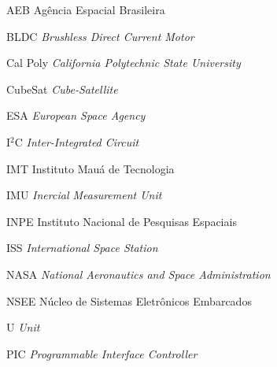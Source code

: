 \documentclass[
	12pt,				%
	openany,			%
	twoside,			%
	a4paper,			%
	english,			%
	french,				%
	spanish,			%
	brazil,				%
	oldfontcommands
	]{abntex2}
\begin{document}
\listoftables*
\cleardoublepage

\begin{siglas}

  \item[AEB] {Agência Espacial Brasileira}
  \item[BLDC] \textit{Brushless Direct Current Motor}
  \item[Cal Poly] \textit{California Polytechnic State University}
  \item[CubeSat] \textit{Cube-Satellite}
  \item[ESA] \textit{European Space Agency}
  \item[I$^{2}$C] \textit{Inter-Integrated Circuit}
  \item[IMT] {Instituto Mauá de Tecnologia}
  \item[IMU] \textit{Inercial Measurement Unit}
  \item[INPE] {Instituto Nacional de Pesquisas Espaciais}
  \item[ISS] \textit{International Space Station}
  \item[NASA] \textit{National Aeronautics and Space Administration}
  \item[NSEE] {Núcleo de Sistemas Eletrônicos Embarcados}
  \item[U] \textit{Unit}
  \item[PIC] \textit{Programmable Interface Controller}
  
\end{siglas}


\tableofcontents*
\cleardoublepage

\textual

\end{document}

